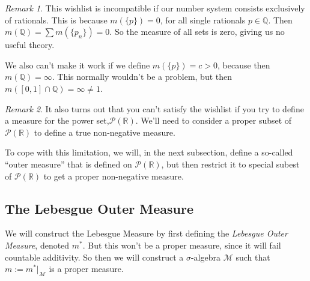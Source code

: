 \documentclass[12pt]{article}
\theoremstyle{plain}
\theoremstyle{definition}
\theoremstyle{remark}
\newtheorem*{rmk}{Remark}
\begin{document}
\begin{rmk}
This wishlist is incompatible if our number system consists exclusively of rationals. This is because $m(\{p\}) = 0$, for all single rationals $p\in\mathbb{Q}$. Then $m(\mathbb{Q})=\sum m(\{p_n\}) = 0$. So the measure of all sets is zero, giving us no useful theory.

We also can't make it work if we define $m(\{p\})=c>0$, because then $m(\mathbb{Q})=\infty$. This normally wouldn't be a problem, but then $m([0,1]\cap \mathbb{Q}) = \infty \neq 1$. 
\end{rmk}

\begin{rmk}
    It also turns out that you can't satisfy the wishlist if you try to define a measure for the power set,$\mathscr{P}(\mathbb{R})$. We'll need to consider a proper subset of $\mathscr{P}(\mathbb{R})$ to define a true non-negative measure.

To cope with this limitation, we will, in the next subsection, define a so-called ``outer measure'' that is defined on $\mathscr{P}(\mathbb{R})$, but then restrict it to special subest of $\mathscr{P}(\mathbb{R})$ to get a proper non-negative measure.
\end{rmk}


\newpage
\subsection{The Lebesgue Outer Measure}

We will construct the Lebesgue Measure by first defining the \emph{Lebesgue Outer Measure}, denoted $m^*$. But this won't be a proper measure, since it will fail countable additivity. So then we will construct a $\sigma$-algebra $\mathscr{M}$ such that $m:=m^*|_\mathscr{M}$ is a proper measure.
\end{document}
